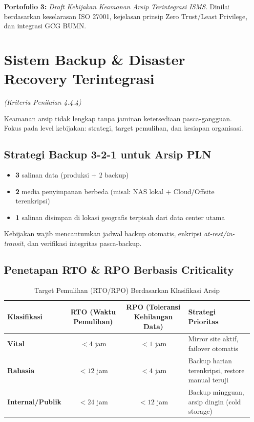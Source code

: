 \documentclass[12pt,a4paper]{report}
\begin{document}
\begin{outputbox}
[DONE] \textbf{Portofolio 3:} \textit{Draft Kebijakan Keamanan Arsip Terintegrasi ISMS}. Dinilai berdasarkan keselarasan ISO 27001, kejelasan prinsip Zero Trust/Least Privilege, dan integrasi GCG BUMN.
\end{outputbox}

\newpage
\chapter{Sistem Backup \& Disaster Recovery Terintegrasi}
\textit{(Kriteria Penilaian 4.4.4)}

Keamanan arsip tidak lengkap tanpa jaminan ketersediaan pasca-gangguan. Fokus pada level kebijakan: strategi, target pemulihan, dan kesiapan organisasi.

\section{Strategi Backup 3-2-1 untuk Arsip PLN}
\begin{itemize}[leftmargin=*]
    \item \textbf{3} salinan data (produksi + 2 backup)
    \item \textbf{2} media penyimpanan berbeda (misal: NAS lokal + Cloud/Offsite terenkripsi)
    \item \textbf{1} salinan disimpan di lokasi geografis terpisah dari data center utama
\end{itemize}
Kebijakan wajib mencantumkan jadwal backup otomatis, enkripsi \textit{at-rest/in-transit}, dan verifikasi integritas pasca-backup.

\section{Penetapan RTO \& RPO Berbasis Criticality}
\begin{table}[htbp]
\centering
\small
\caption{Target Pemulihan (RTO/RPO) Berdasarkan Klasifikasi Arsip}
\begin{tabularx}{\textwidth}{@{} l c c X @{}}
\toprule
\textbf{Klasifikasi} & \textbf{RTO (Waktu Pemulihan)} & \textbf{RPO (Toleransi Kehilangan Data)} & \textbf{Strategi Prioritas} \\
\midrule
\textbf{Vital} & $< 4$ jam & $< 1$ jam & Mirror site aktif, failover otomatis \\
\textbf{Rahasia} & $< 12$ jam & $< 4$ jam & Backup harian terenkripsi, restore manual teruji \\
\textbf{Internal/Publik} & $< 24$ jam & $< 12$ jam & Backup mingguan, arsip dingin (cold storage) \\
\bottomrule
\end{tabularx}
\end{table}
\end{document}
